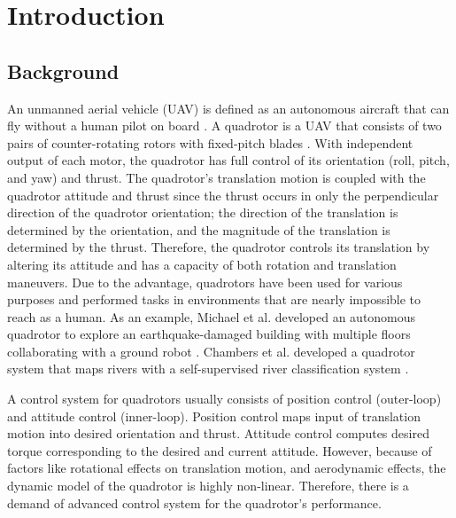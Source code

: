 \chapter{Introduction}
\section{Background}
An unmanned aerial vehicle (UAV) is defined as an autonomous aircraft that can fly without a human pilot on board \cite{icao16}. %
A quadrotor is a UAV that consists of two pairs of counter-rotating rotors with fixed-pitch blades \cite{Hoffmann07}. %
With independent output of each motor, the quadrotor has full control of its orientation (roll, pitch, and yaw) and thrust. The quadrotor's translation motion is coupled with the quadrotor attitude and thrust since the thrust occurs in only the perpendicular direction of the quadrotor orientation; the direction of the translation is determined by the orientation, and the magnitude of the translation is determined by the thrust. Therefore, the quadrotor controls its translation by altering its attitude and has a capacity of both rotation and translation maneuvers. Due to the advantage, quadrotors have been used for various purposes and performed tasks in environments that are nearly impossible to reach as a human. As an example, Michael et al. developed an autonomous quadrotor to explore an earthquake-damaged building with multiple floors collaborating with a ground robot \cite{Michael02}. %
Chambers et al. developed a quadrotor system that maps rivers with a self-supervised river classification system \cite{Chambers11}.

A control system for quadrotors usually consists of position control (outer-loop) and attitude control (inner-loop). Position control maps input of translation motion into desired orientation and thrust. Attitude control computes desired torque corresponding to the desired and current attitude. However, because of factors like rotational effects on translation motion, and aerodynamic effects, the dynamic model of the quadrotor is highly non-linear. Therefore, there is a demand of advanced control system for the quadrotor's performance.

